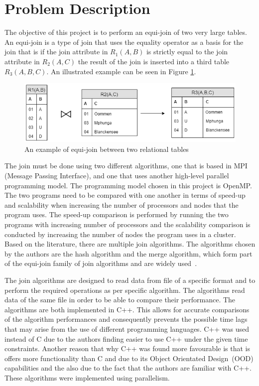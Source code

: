 \documentclass[journal,draftclsnofoot]{IEEEtran}
\begin{document}
\section{Problem Description}\label{prob}
The objective of this project is to perform an equi-join of two very large tables. An equi-join is a type of join that uses the equality operator as a basis for the join \cite{w3resource.com2018} that is if the join attribute in $R_{1}(A,B)$ is strictly equal to the join attribute in $R_{2}(A,C)$ the result of the join is inserted into a third table $R_{3}(A, B, C)$. An illustrated example can be seen in Figure \ref{fig:Equi-Join}.
\begin{figure}[htbp]
	\centering
		\includegraphics[width=1.00\textwidth]{Equi-Join.png}
	\caption{An example of equi-join between two relational tables}
	\label{fig:Equi-Join}
\end{figure}
The join must be done using two different algorithms, one that is based in MPI (Message Passing Interface), and one that uses another high-level parallel programming model. The programming model chosen in this project is OpenMP. The two programs need to be compared with one another in terms of speed-up and scalability when increasing the number of processors and nodes that the program uses. The speed-up comparison is performed by running the two programs with increasing number of processors and the scalability comparison is conducted by increasing the number of nodes the program uses in a cluster. Based on the literature, there are multiple join algorithms. The algorithms chosen by the authors are the hash algorithm and the merge algorithm, which form part of the equi-join family of join algorithms and are widely used~\cite{Wolf1993}.

The join algorithms are designed to read data from  file of a specific format and to perform the required operations as per specific algorithm. The algorithms read data of the same file in order to be able to compare their performance. The algorithms are both implemented in C++. This allows for accurate comparisons of the algorithm performances and consequently prevents the possible time lags that may arise from the use of different programming languages. C++ was used instead of C due to the authors finding easier to use C++ under the given time constraints. Another reason that why C++ was found more favourable is that is offers more functionality than C and due to its Object Orientated Design~(OOD) capabilities and the also due to the fact that the authors are familiar with C++. These algorithms were implemented using parallelism.
\end{document}

